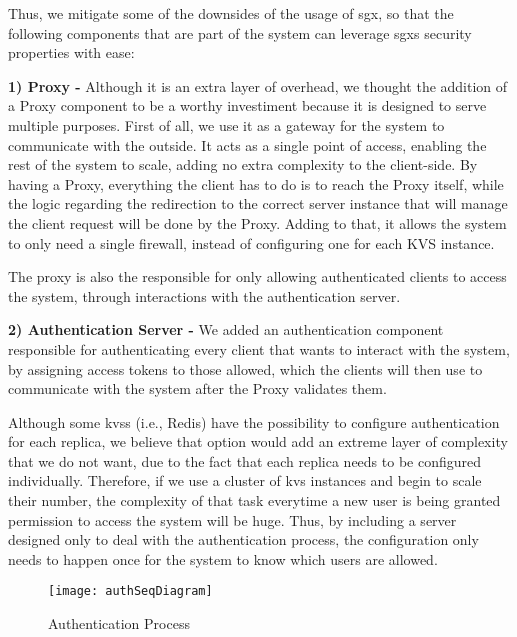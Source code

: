 Thus, we mitigate some of the downsides of the usage of \gls{sgx}, so that the following components that are part of the system can leverage \gls{sgx}s security properties with ease:

\vspace{5mm} 

\textbf{1) Proxy -}
Although it is an extra layer of overhead, we thought the addition of a Proxy component to be a worthy investiment because it is designed to serve multiple purposes. 
First of all, we use it as a gateway for the system to communicate with the outside. It acts as a single point of access, enabling the rest of the system to scale, adding no extra complexity to the client-side. By having a Proxy, everything the client has to do is to reach the Proxy itself, while the logic regarding the redirection to the correct server instance that will manage the client request will be done by the Proxy. Adding to that, it allows the system to only need a single firewall, instead of configuring one for each KVS instance.

The proxy is also the responsible for only allowing authenticated clients to access the system, through interactions with the authentication server. 

\vspace{5mm} 

\textbf{2) Authentication Server -} 
We added an authentication component responsible for authenticating every client that wants to interact with the system, by assigning access tokens to those allowed, which the clients will then use to communicate with the system after the Proxy validates them.
 
Although some \gls{kvs}s (i.e., Redis) have the possibility to configure authentication for each replica, we believe that option would add an extreme layer of complexity that we do not want, due to the fact that each replica needs to be configured individually. Therefore, if we use a cluster of \gls{kvs} instances and begin to scale their number, the complexity of that task everytime a new user is being granted permission to access the system will be huge. Thus, by including a server designed only to deal with the authentication process, the configuration only needs to happen once for the system to know which users are allowed.



\vspace{3mm}

\begin{figure}[htbp]
	\centering
	{\texttt{[image: authSeqDiagram]}}
	\caption{Authentication Process}
	\label{fig:authProcess}
\end{figure}

